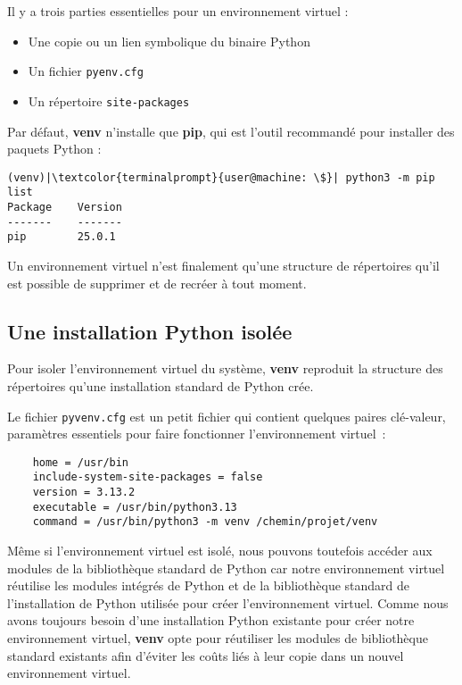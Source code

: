 Il y a trois parties essentielles pour un environnement virtuel :

\begin{itemize}
    \item Une copie ou un lien symbolique du binaire Python
    \item Un fichier \texttt{pyenv.cfg}
    \item Un répertoire \texttt{site-packages}
\end{itemize}

Par défaut, \textbf{venv} n'installe que \textbf{pip}, qui est l'outil recommandé pour installer des paquets Python :
\begin{lstlisting}[style=terminal]
(venv)|\textcolor{terminalprompt}{user@machine: \$}| python3 -m pip list
Package    Version
-------    -------
pip        25.0.1
\end{lstlisting}

Un environnement virtuel n’est finalement qu’une structure de répertoires qu'il est possible de supprimer et de recréer à tout moment.

\subsection*{Une installation Python isolée}

Pour isoler l'environnement virtuel du système, \textbf{venv} reproduit la structure des répertoires qu’une installation standard de Python crée.

Le fichier \texttt{pyvenv.cfg} est un petit fichier qui contient quelques paires clé-valeur, paramètres essentiels pour faire fonctionner l'environnement virtuel :
\begin{verbatim}
    home = /usr/bin
    include-system-site-packages = false
    version = 3.13.2
    executable = /usr/bin/python3.13
    command = /usr/bin/python3 -m venv /chemin/projet/venv
\end{verbatim}

Même si l'environnement virtuel est isolé, nous pouvons toutefois accéder aux modules de la bibliothèque standard de Python car notre environnement virtuel réutilise les modules intégrés de Python et de la bibliothèque standard de l’installation de Python utilisée pour créer l'environnement virtuel. Comme nous avons toujours besoin d’une installation Python existante pour créer notre environnement virtuel, \textbf{venv} opte pour réutiliser les modules de bibliothèque standard existants afin d’éviter les coûts liés à leur copie dans un nouvel environnement virtuel.

